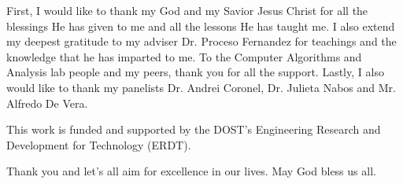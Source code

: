 \begin{acknowledgments}

	First, I would like to thank my God and my Savior Jesus Christ for all the blessings He has given to me and all the lessons He has taught me. I also extend my deepest gratitude to my adviser Dr. Proceso Fernandez for teachings and the knowledge that he has imparted to me. To the Computer Algorithms and Analysis lab people and my peers, thank you for all the support. Lastly, I also would like to thank my panelists Dr. Andrei Coronel, Dr. Julieta Nabos and Mr. Alfredo De Vera. 

	This work is funded and supported by the DOST's Engineering Research and Development for Technology (ERDT).

	Thank you and let's all aim for excellence in our lives. May God bless us all.
	
\end{acknowledgments}
